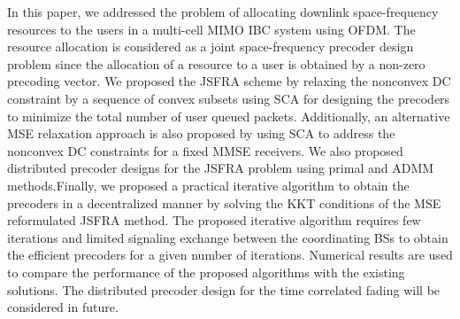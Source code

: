 In this paper, we addressed the problem of allocating downlink space-frequency resources to the users in a multi-cell \ac{MIMO} \ac{IBC} system using \ac{OFDM}. The resource allocation is considered as a joint space-frequency precoder design problem since the allocation of a resource to a user is obtained by a non-zero precoding vector. We proposed the \ac{JSFRA} scheme by relaxing the nonconvex \ac{DC} constraint by a sequence of convex subsets using \ac{SCA} for designing the precoders to minimize the total number of user queued packets. Additionally, an alternative \ac{MSE} relaxation approach is also proposed by using \ac{SCA} to address the nonconvex \ac{DC} constraints for a fixed \ac{MMSE} receivers. We also proposed distributed precoder designs for the \ac{JSFRA} problem using primal and \ac{ADMM} methods.Finally, we proposed a practical iterative algorithm to obtain the precoders in a decentralized manner by solving the \ac{KKT} conditions of the \ac{MSE} reformulated \ac{JSFRA} method.  The proposed iterative algorithm requires few iterations and limited signaling exchange between the coordinating \acp{BS} to obtain the efficient precoders for a given number of iterations. Numerical results are used to compare the performance of the proposed algorithms with the existing solutions. The distributed precoder design for the time correlated fading will be considered in future.